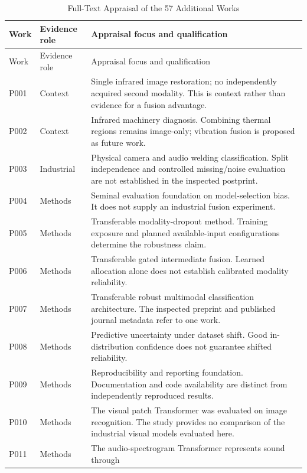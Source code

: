 \begingroup\small
\begin{longtable}{@{}P{.25\textwidth}P{.16\textwidth}P{.53\textwidth}@{}}
\caption{Full-Text Appraisal of the 57 Additional Works}\label{tab:expanded-register}\\
\toprule Work & Evidence role & Appraisal focus and qualification \\
\midrule\endfirsthead
\toprule Work & Evidence role & Appraisal focus and qualification \\
\midrule\endhead
P001 \parencite{P001} & Context & Single infrared image restoration; no independently
acquired second modality. This is context rather than evidence for a fusion advantage.
\\
P002 \parencite{P002} & Context & Infrared machinery diagnosis. Combining thermal regions
remains image-only; vibration fusion is proposed as future work. \\
P003 \parencite{P003} & Industrial & Physical camera and audio welding classification. Split
independence and controlled missing/noise evaluation are not established in the
inspected postprint. \\
P004 \parencite{P004} & Methods & Seminal evaluation foundation on model-selection bias. It
does not supply an industrial fusion experiment. \\
P005 \parencite{P005} & Methods & Transferable modality-dropout method. Training exposure
and planned available-input configurations determine the robustness claim. \\
P006 \parencite{P006} & Methods & Transferable gated intermediate fusion. Learned allocation
alone does not establish calibrated modality reliability. \\
P007 \parencite{P007} & Methods & Transferable robust multimodal classification
architecture. The inspected preprint and published journal metadata refer to one work.
\\
P008 \parencite{P008} & Methods & Predictive uncertainty under dataset shift. Good
in-distribution confidence does not guarantee shifted reliability. \\
P009 \parencite{P009} & Methods & Reproducibility and reporting foundation. Documentation
and code availability are distinct from independently reproduced results. \\
P010 \parencite{P010} & Methods & The visual patch Transformer was evaluated on image
recognition. The study provides no comparison of the industrial visual models evaluated
here. \\
P011 \parencite{P011} & Methods & The audio-spectrogram Transformer represents sound through

\end{longtable}
